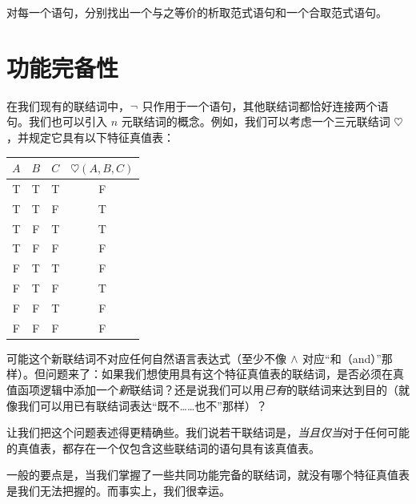         对每一个语句，分别找出一个与之等价的析取范式语句和一个合取范式语句。

\chapter{功能完备性}\label{c:FunctionalCompleteness}

在我们现有的联结词中，$\neg$ 只作用于一个语句，其他联结词都恰好连接两个语句。我们也可以引入 $n$ 元联结词的概念。例如，我们可以考虑一个三元联结词 $\heartsuit$，并规定它具有以下特征真值表：

\begin{center}
\begin{tabular}{c c c | c}
$A$ & $B$ & $C$ & $\heartsuit(A,B,C)$\\
\hline
 T & T & T & F \\
 T & T & F & T \\
 T & F & T & T \\
 T & F & F & F \\
 F & T & T & F \\
 F & T & F & T \\
 F & F & T & F \\
 F & F & F & F
\end{tabular}
\end{center}

可能这个新联结词不对应任何自然语言表达式（至少不像 $\wedge$ 对应“和（and）”那样）。但问题来了：如果我们想使用具有这个特征真值表的联结词，是否必须在真值函项逻辑中添加一个\emph{新}联结词？还是说我们可以用\emph{已有}的联结词来达到目的（就像我们可以用已有联结词表达“既不……也不”那样）？

让我们把这个问题表述得更精确些。我们说若干联结词是，\emph{当且仅当}对于任何可能的真值表，都存在一个仅包含这些联结词的语句具有该真值表。


一般的要点是，当我们掌握了一些共同功能完备的联结词，就没有哪个特征真值表是我们无法把握的。而事实上，我们很幸运。

